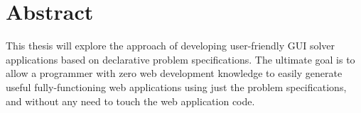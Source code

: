 \chapter*{Abstract}\label{abstract}


This thesis will explore the approach of developing user-friendly GUI solver applications based on declarative problem specifications. The ultimate goal is to allow a programmer with zero web development knowledge to easily generate useful fully-functioning web applications using just the problem specifications, and without any need to touch the web application code.

